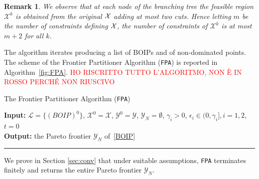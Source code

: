 \documentclass[preprint,12pt]{elsarticle}
\newcommand{\red}[1]{\textcolor{red}{#1}}
\newtheorem{remark}[theorem]{Remark}
\def\R{\mathbb{R}}
\def\Z{\mathbb{Z}}
\begin{document}
\begin{remark}\label{rem:number_cuts}
We observe that at each node of the branching tree the feasible region $\mathcal{X}^k$
is obtained from the original $\cal X$ adding at most two cuts. Hence letting $m$ be the number of constraints defining $\cal X$, the number of constraints of $\mathcal{X}^k$ is at most $m+2$ for all $k$.
\end{remark}

The algorithm iterates producing a list of BOIPs and of non-dominated points.
The scheme of the Frontier Partitioner Algorithm (\texttt{FPA}) is reported in Algorithm~\ref{fig:FPA}.
\red{HO RISCRITTO TUTTO L'ALGORITMO, NON È IN ROSSO PERCHÉ NON RIUSCIVO}
\begin{algorithm}
  \caption{The Frontier Partitioner Algorithm ({\tt FPA})}
  \label{fig:FPA}
      {\bf Input:} \hspace*{0.125cm}  $\mathcal{L} = \{(BOIP)^0\}$, $\mathcal{X}^0= \mathcal{X}$,\; $\mathcal{Y}^0= \mathcal{Y}$,\; $\mathcal{Y}_N = \emptyset$,\;
      $\gamma_i >0$, $\epsilon_i \in (0, \gamma_i], i=1,2$, $t= 0$\\[1ex]
      {\bf Output:} the Pareto frontier $\mathcal{Y}_N$ of~\eqref{BOIP}
      \smallskip
      \hrule
      \smallskip
      \begin{algorithmic}[1] %
         \label{step:Select}
         \State {{\bf Build} $(BOIP)^{t+i}$ from $(BOIP)^k$, as \label{step:newnodes}
          \[
         \min_{x\in \mathcal{X}^{k}_i\cap \Z^n} y(x) \  \mbox{ with }\  
         \mathcal{X}^{t+i}= \mathcal{X}^k \cap \{x\in \R^n\,:\, y_i(x)\leq \hat y^k_i - \epsilon_i \}, \   i = 1,2,
         \]}
 \EndIf
        \EndWhile
      \end{algorithmic}
\end{algorithm}


We prove in Section \ref{sec:conv} that under suitable assumptions, \texttt{FPA} terminates finitely  and returns the entire Pareto frontier $\mathcal{Y}_N$.
\end{document}
